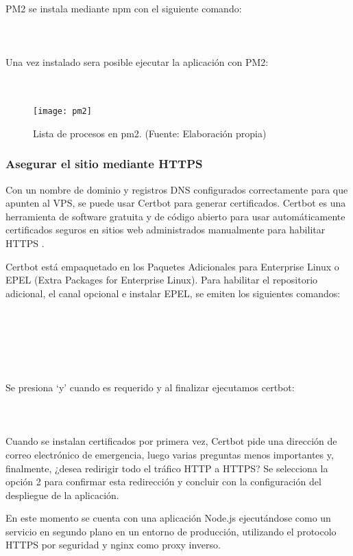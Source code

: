PM2 se instala mediante npm con el siguiente comando:\\
\\
\\
\\
Una vez instalado sera posible ejecutar la aplicación con PM2:\\
\\
\\

\begin{figure}[H]
  \centering
  \texttt{[image: pm2]}
  \caption{Lista de procesos en pm2. (Fuente: Elaboración propia)}
\end{figure}

\subsubsection{Asegurar el sitio mediante HTTPS}
Con un nombre de dominio y registros DNS configurados correctamente para que apunten al VPS, se puede usar Certbot para generar certificados. Certbot es una herramienta de software gratuita y de código abierto para usar automáticamente certificados seguros en sitios web administrados manualmente para habilitar HTTPS \cite{certbot}.
\vspace{0.8cm}

Certbot está empaquetado en los Paquetes Adicionales para Enterprise Linux o EPEL (Extra Packages for Enterprise Linux). Para habilitar el repositorio adicional, el canal opcional e instalar EPEL, se emiten los siguientes comandos:\\
\\
\\
\\
\\
\\
\\
Se presiona `y' cuando es requerido y al finalizar ejecutamos certbot:\\
\\
\\
\\
Cuando se instalan certificados por primera vez, Certbot pide una dirección de correo electrónico de emergencia, luego varias preguntas menos importantes y, finalmente, ¿desea redirigir todo el tráfico HTTP a HTTPS? Se selecciona la opción 2 para confirmar esta redirección y concluir con la configuración del despliegue de la aplicación.
\vspace{0.8cm}

En este momento se cuenta con una aplicación Node.js ejecutándose como un servicio en segundo plano en un entorno de producción, utilizando el protocolo HTTPS por seguridad y nginx como proxy inverso.
